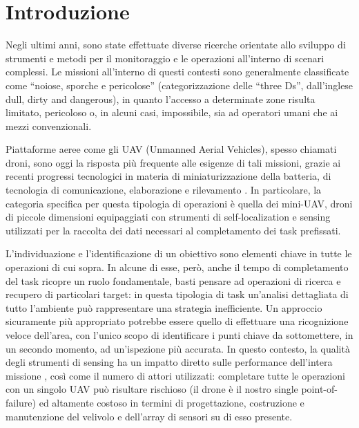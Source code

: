 \setlength{\parskip}{0.3cm}
\chapter{Introduzione}

Negli ultimi anni, sono state effettuate diverse ricerche orientate allo sviluppo di strumenti e metodi per il monitoraggio e le operazioni all’interno di scenari complessi. 
Le missioni all’interno di questi contesti sono generalmente classificate come “noiose, sporche e pericolose” (categorizzazione delle “three Ds”, dall’inglese dull, dirty and dangerous), in quanto l’accesso a determinate zone risulta limitato, pericoloso o, in alcuni casi, impossibile, sia ad operatori umani che ai mezzi convenzionali.

Piattaforme aeree come gli UAV (Unmanned Aerial Vehicles), spesso chiamati droni, sono oggi la risposta più frequente alle esigenze di tali missioni, grazie ai recenti progressi tecnologici in materia di miniaturizzazione della batteria, di tecnologia di comunicazione, elaborazione e rilevamento \cite{whitehead2014remote}. 
In particolare, la categoria specifica per questa tipologia di operazioni è quella dei mini-UAV, droni di piccole dimensioni equipaggiati con strumenti di self-localization e sensing utilizzati per la raccolta dei dati necessari al completamento dei task prefissati.

L'individuazione e l'identificazione di un obiettivo sono elementi chiave in tutte le operazioni di cui sopra.
In alcune di esse, però, anche il tempo di completamento del task ricopre un ruolo fondamentale, basti pensare ad operazioni di ricerca e recupero di particolari target: in questa tipologia di task un’analisi dettagliata di tutto l’ambiente può rappresentare una strategia inefficiente. 
Un approccio sicuramente più appropriato potrebbe essere quello di effettuare una ricognizione veloce dell’area, con l’unico scopo di identificare i punti chiave da sottomettere, in un secondo momento, ad un'ispezione più accurata. 
In questo contesto, la qualità degli strumenti di sensing ha un impatto diretto sulle performance dell'intera missione \cite{bertuccelli2005robust}, così come il numero di attori utilizzati: completare tutte le operazioni con un singolo UAV può risultare rischioso (il drone è il nostro single point-of-failure) ed altamente costoso in termini di progettazione, costruzione e manutenzione del velivolo e dell'array di sensori su di esso presente.

